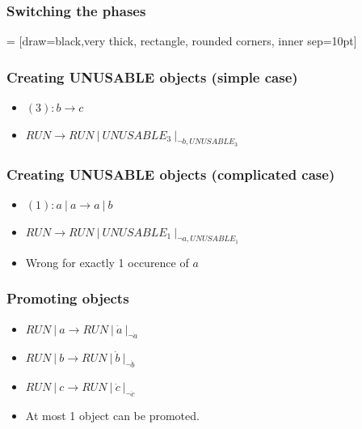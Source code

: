     \begin{frame}[t]\frametitle{Switching the phases}
       = [draw=black,very thick, rectangle, rounded corners, inner sep=10pt]
    \end{frame}
    \note{}

    \begin{frame}[t]\frametitle{Creating UNUSABLE objects (simple case)}
      \begin{itemize}
        \item $(3): b \rightarrow c$
        \item $RUN \rightarrow RUN\ |\ UNUSABLE_3\ |_{\neg{b,UNUSABLE_3}}$
      \end{itemize}
    \end{frame}
    \note{}

    \begin{frame}[t]\frametitle{Creating UNUSABLE objects (complicated case)}
      \begin{itemize}
        \item $(1): a\ |\ a \rightarrow a\ |\ b$
        \item $RUN \rightarrow RUN\ |\ UNUSABLE_1\ |_{\neg{a,UNUSABLE_1}}$
        \item Wrong for exactly 1 occurence of $a$
      \end{itemize}
    \end{frame}
    \note{}

    \begin{frame}[t]\frametitle{Promoting objects}
      \begin{itemize}
        \item $RUN\ |\ a \rightarrow RUN\ |\ \dot{a}\ |_{\neg{\dot{a}}}$
        \item $RUN\ |\ b \rightarrow RUN\ |\ \dot{b}\ |_{\neg{\dot{b}}}$
        \item $RUN\ |\ c \rightarrow RUN\ |\ \dot{c}\ |_{\neg{\dot{c}}}$
        \item At most 1 object can be promoted.
      \end{itemize}
    \end{frame}
    \note{}

